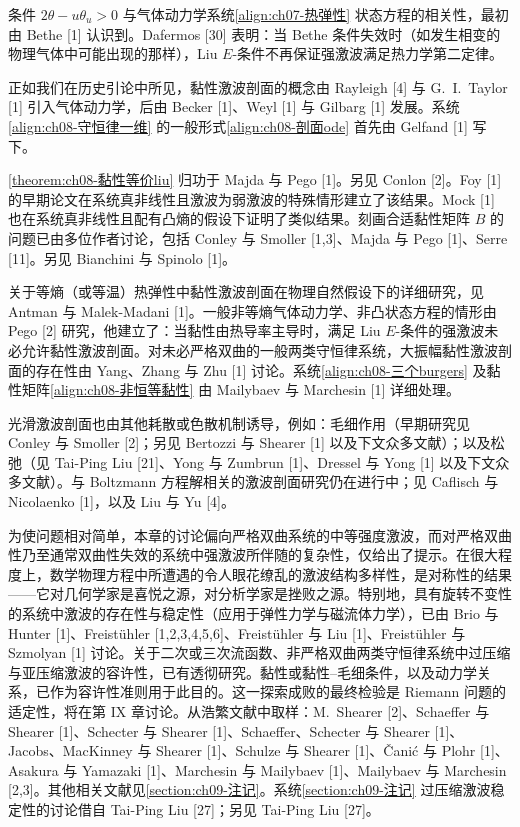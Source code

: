 \documentclass[../../main.tex]{subfiles}
\begin{document}
条件 $2\theta-u\theta_u>0$ 与气体动力学系统\eqref{align:ch07-热弹性} 状态方程的相关性，最初由 Bethe [1] 认识到。Dafermos [30] 表明：当 Bethe 条件失效时（如发生相变的物理气体中可能出现的那样），Liu $E$-条件不再保证强激波满足热力学第二定律。

正如我们在历史引论中所见，黏性激波剖面的概念由 Rayleigh [4] 与 G.\ I.\ Taylor [1] 引入气体动力学，后由 Becker [1]、Weyl [1] 与 Gilbarg [1] 发展。系统\eqref{align:ch08-守恒律一维} 的一般形式\eqref{align:ch08-剖面ode} 首先由 Gelfand [1] 写下。

\cref{theorem:ch08-黏性等价liu} 归功于 Majda 与 Pego [1]。另见 Conlon [2]。Foy [1] 的早期论文在系统真非线性且激波为弱激波的特殊情形建立了该结果。Mock [1] 也在系统真非线性且配有凸熵的假设下证明了类似结果。刻画合适黏性矩阵 $B$ 的问题已由多位作者讨论，包括 Conley 与 Smoller [1,3]、Majda 与 Pego [1]、Serre [11]。另见 Bianchini 与 Spinolo [1]。

关于等熵（或等温）热弹性中黏性激波剖面在物理自然假设下的详细研究，见 Antman 与 Malek-Madani [1]。一般非等熵气体动力学、非凸状态方程的情形由 Pego [2] 研究，他建立了：当黏性由热导率主导时，满足 Liu $E$-条件的强激波未必允许黏性激波剖面。对未必严格双曲的一般两类守恒律系统，大振幅黏性激波剖面的存在性由 Yang、Zhang 与 Zhu [1] 讨论。系统\eqref{align:ch08-三个burgers} 及黏性矩阵\eqref{align:ch08-非恒等黏性} 由 Mailybaev 与 Marchesin [1] 详细处理。

光滑激波剖面也由其他耗散或色散机制诱导，例如：毛细作用（早期研究见 Conley 与 Smoller [2]；另见 Bertozzi 与 Shearer [1] 以及下文众多文献）；以及松弛（见 Tai-Ping Liu [21]、Yong 与 Zumbrun [1]、Dressel 与 Yong [1] 以及下文众多文献）。与 Boltzmann 方程解相关的激波剖面研究仍在进行中；见 Caflisch 与 Nicolaenko [1]，以及 Liu 与 Yu [4]。

为使问题相对简单，本章的讨论偏向严格双曲系统的中等强度激波，而对严格双曲性乃至通常双曲性失效的系统中强激波所伴随的复杂性，仅给出了提示。在很大程度上，数学物理方程中所遭遇的令人眼花缭乱的激波结构多样性，是对称性的结果——它对几何学家是喜悦之源，对分析学家是挫败之源。特别地，具有旋转不变性的系统中激波的存在性与稳定性（应用于弹性力学与磁流体力学），已由 Brio 与 Hunter [1]、Freistühler [1,2,3,4,5,6]、Freistühler 与 Liu [1]、Freistühler 与 Szmolyan [1] 讨论。关于二次或三次流函数、非严格双曲两类守恒律系统中过压缩与亚压缩激波的容许性，已有透彻研究。黏性或黏性--毛细条件，以及动力学关系，已作为容许性准则用于此目的。这一探索成败的最终检验是 Riemann 问题的适定性，将在第 IX 章讨论。从浩繁文献中取样：M.\ Shearer [2]、Schaeffer 与 Shearer [1]、Schecter 与 Shearer [1]、Schaeffer、Schecter 与 Shearer [1]、Jacobs、MacKinney 与 Shearer [1]、Schulze 与 Shearer [1]、Čanić 与 Plohr [1]、Asakura 与 Yamazaki [1]、Marchesin 与 Mailybaev [1]、Mailybaev 与 Marchesin [2,3]。其他相关文献见\cref{section:ch09-注记}。系统\cref{section:ch09-注记} 过压缩激波稳定性的讨论借自 Tai-Ping Liu [27]；另见 Tai-Ping Liu [27]。
\end{document}
